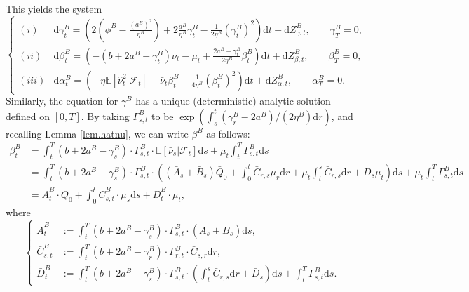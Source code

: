 \documentclass[10pt]{article}
\def\d{\mathrm{d}}
\begin{document}
This yields the system
$$
\left\{
\begin{array}{ll}
(i) & \d \gamma^B_t = \left( 2 \left( \phi^B - \frac{(a^B)^2}{\eta^B} \right) + 2\frac{a^B}{\eta^B}\gamma^B_t - \frac{1}{2\eta^B} (\gamma^B_t)^2 \right) \d t + \d Z^B_{\gamma,t}, \qquad \gamma^B_T = 0, \\ [1ex]
(ii) & \d \beta^B_t = \left( - \left( b + 2 a^B -\gamma^B_t \right) \bar{\nu}_t  - {\mu}_t + \frac{2a^B - \gamma^B_t}{2\eta^B} \beta^B_t \right) \d t + \d Z^B_{\beta,t}, \qquad \beta^B_T = 0, \\ [1ex]
(iii) & \d \alpha^B_t = \left( - \eta \mathbb{E}[\hat{\nu}_t^2 | \mathcal{F}_t] + \bar{\nu}_t \beta^B_t - \frac{1}{4\eta^B} (\beta^B_t)^2 \right) \d t + \d Z^B_{\alpha,t}, \qquad \alpha^B_T = 0.
\end{array}
\right.
$$
Similarly, the equation for $\gamma^B$ has a unique (deterministic) analytic solution defined on $[0,T]$.
By taking $\Gamma^B_{s,t}$ to be $\exp(\int_s^t (\gamma^B_r - 2a^B) / (2\eta^B) \d r)$, and recalling Lemma \ref{lem.hatnu}, we can write $\beta^B$ as follows:
\begin{equation}\label{defbetaB}
\begin{aligned}
\beta^B_t &= \int_t^T (b + 2a^B - \gamma^B_s) \cdot \Gamma^B_{s,t} \cdot \mathbb{E}[\bar{\nu}_s | \mathcal{F}_t] \d s + \mu_t \int_t^T \Gamma^B_{s,t} \d s \\
          &= \int_t^T (b + 2a^B - \gamma^B_s) \cdot \Gamma^B_{s,t} \cdot \left( (\bar{A}_s + \bar{B}_s) \bar{Q}_0 + \int_0^t \bar{C}_{r,s} \mu_r \d r + \mu_t \int_t^s \bar{C}_{r,s} \d r + D_s \mu_t \right) \d s + \mu_t \int_t^T \Gamma^B_{s,t} \d s \\
          &= \bar{A}_t^B \cdot \bar{Q}_0 + \int_0^t \bar{C}_{s,t}^B \cdot \mu_s \d s + \bar{D}_t^B \cdot \mu_t,
\end{aligned}
\end{equation}
where
\begin{equation}\label{barAB_barCB_barDB_definition}
\left\{
\begin{array}{ll}
    \bar{A}_t^B     & := \int_t^T (b + 2a^B - \gamma^B_s) \cdot \Gamma^B_{s,t} \cdot (\bar{A}_s + \bar{B}_s) \d s, \\
    \bar{C}_{s,t}^B & := \int_t^T (b + 2a^B - \gamma^B_r) \cdot \Gamma^B_{r,t} \cdot \bar{C}_{s,r} \d r, \\
    \bar{D}_t^B     & := \int_t^T (b + 2a^B - \gamma^B_s) \cdot \Gamma^B_{s,t} \cdot \left( \int_t^s \bar{C}_{r,s} \d r + \bar{D}_s \right) \d s + \int_t^T \Gamma^B_{s,t} \d s.
\end{array}
\right.
\end{equation}
\end{document}
